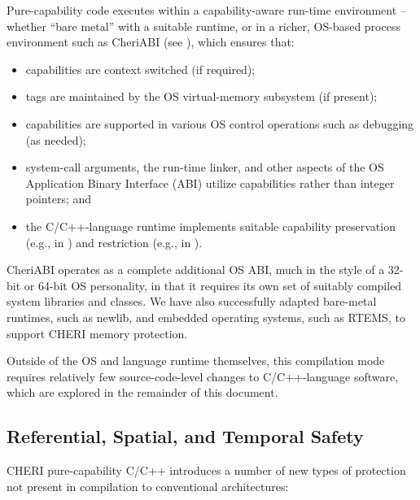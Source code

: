 \documentclass[12pt,twoside,openright,a4paper]{article}
\newcommand{\ccode}[1]{{\small\ttfamily{#1}}}
\newcommand{\cfunc}[1]{{\ccode{#1()}}}
\begin{document}
Pure-capability code executes within a capability-aware run-time environment
-- whether ``bare metal'' with a suitable runtime, or in a richer, OS-based
process environment such as CheriABI (see ),
which ensures that:
\begin{itemize}
  \item capabilities are context switched (if required);
  \item tags are maintained by the OS virtual-memory subsystem (if present);
  \item capabilities are supported in various OS control operations such as
    debugging (as needed);
  \item system-call arguments, the
run-time linker, and other aspects of the OS Application Binary Interface
(ABI) utilize capabilities rather than integer pointers; and
  \item the C/C++-language runtime implements suitable capability preservation
    \\
    (e.g., in \cfunc{memcpy}) and restriction (e.g., in \cfunc{malloc}).
\end{itemize}
CheriABI operates as a complete additional OS ABI, much in the style of a
32-bit or 64-bit OS personality, in that it requires its own set of suitably
compiled system libraries and classes.
We have also successfully adapted bare-metal runtimes, such as newlib, and
embedded operating systems, such as RTEMS, to support CHERI memory protection.

Outside of the OS and language runtime themselves, this compilation mode
requires relatively few source-code-level changes to C/C++-language software,
which are explored in the remainder of this document.

\subsection{Referential, Spatial, and Temporal Safety}

CHERI pure-capability C/C++ introduces a number of new types of protection not
present in compilation to conventional architectures:
\end{document}
